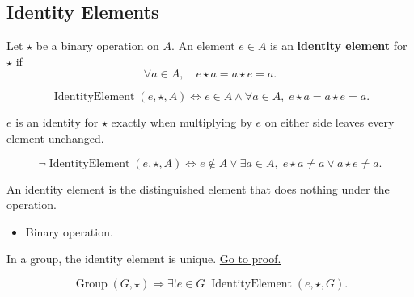\subsection*{Identity Elements}
\label{subsec:identity-elements}

\begin{definition}
\label{def:identity-element}
Let $\star$ be a binary operation on $A$.
An element $e\in A$ is an \textbf{identity element} for $\star$ if
\[
\forall a\in A,\quad e\star a=a\star e=a.
\]
\end{definition}

\begin{remark*}
\[
\operatorname{IdentityElement}(e,\star,A)
\Longleftrightarrow
e\in A
\land
\forall a\in A,\; e\star a=a\star e=a.
\]
\end{remark*}

\begin{remark*}
$e$ is an identity for $\star$ exactly when multiplying by $e$ on either side
leaves every element unchanged.
\end{remark*}

\begin{remark*}
\[
\neg\operatorname{IdentityElement}(e,\star,A)
\Longleftrightarrow
e\notin A
\lor
\exists a\in A,\; e\star a\neq a \lor a\star e\neq a.
\]
\end{remark*}

\begin{remark*}[Interpretation]
An identity element is the distinguished element that does nothing under the
operation.
\end{remark*}

\begin{remark*}[Dependencies]
\begin{itemize}
  \item Binary operation.
\end{itemize}
\end{remark*}

\begin{proposition}
\label{prop:group-identity-unique}
In a group, the identity element is unique.
\hyperref[prf:group-identity-unique]{Go to proof.}
\end{proposition}

\begin{remark*}
\[
\operatorname{Group}(G,\star)
\Longrightarrow
\exists! e\in G\; \operatorname{IdentityElement}(e,\star,G).
\]
\end{remark*}

